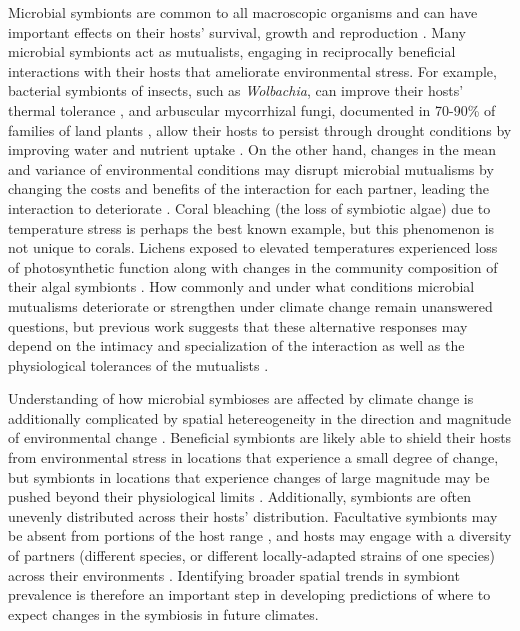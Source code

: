 \documentclass[11pt]{article}
\begin{document}
Microbial symbionts are common to all macroscopic organisms and can have important effects on their hosts' survival, growth and reproduction \cite{rodriguez2009fungal,mcfall2013animals}.
Many microbial symbionts act as mutualists, engaging in reciprocally beneficial interactions with their hosts that ameliorate environmental stress. 
For example, bacterial symbionts of insects, such as \emph{Wolbachia}, can improve their hosts' thermal tolerance \citep{truitt2019wolbachia, renoz2019evolutionary}, and arbuscular mycorrhizal fungi, documented in 70-90\% of families of land plants \citep{parniske2008arbuscular}, allow their hosts to persist through drought conditions by improving water and nutrient uptake \citep{cheng2021elucidating}.
On the other hand, changes in the mean and variance of environmental conditions may disrupt microbial  mutualisms by changing the costs and benefits of the interaction for each partner, leading the interaction to deteriorate \citep{aslan2013mutualism}. 
Coral bleaching (the loss of symbiotic algae) due to temperature stress \citep{sully2019global} is perhaps the best known example, but this phenomenon is not unique to corals.
Lichens exposed to elevated temperatures experienced loss of photosynthetic function along with changes in the community composition of their algal symbionts \citep{meyer2022climate}.
How commonly and under what conditions microbial mutualisms deteriorate or strengthen under climate change remain unanswered questions, but previous work suggests that these alternative responses may depend on the intimacy and specialization of the interaction as well as the physiological tolerances of the mutualists \citep{toby2010mutualisms, warren2014mutualism, rafferty2015phenological}. 

Understanding of how microbial symbioses are affected by climate change is additionally complicated by spatial hetereogeneity in the direction and magnitude of environmental change \cite{ipcc_2021}. 
Beneficial symbionts are likely able to shield their hosts from environmental stress in locations that experience a small degree of change, but symbionts in locations that experience changes of large magnitude may be pushed beyond their physiological limits \cite{webster2008temperature}.
Additionally, symbionts are often unevenly distributed across their hosts' distribution.
Facultative symbionts may be absent from portions of the host range \cite{afkhami2014mutualist}, and hosts may engage with a diversity of partners (different species, or different locally-adapted strains of one species) across their environments \cite{frade2008variation, rolshausen2018quantifying}.
Identifying broader spatial trends in symbiont prevalence is therefore an important step in developing predictions of where to expect changes in the symbiosis in future climates.
\end{document}
